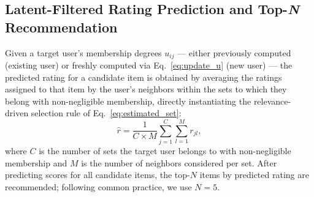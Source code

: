 \documentclass{article}
\theoremstyle{plain}
\theoremstyle{definition}
\theoremstyle{remark}
\begin{document}
\subsection{Latent-Filtered Rating Prediction and Top-\textit{N} Recommendation}
\label{subsec:rating_prediction}

Given a target user's membership degrees $u_{ij}$ — either previously computed (existing user) or freshly computed via Eq.~\eqref{eq:update_u} (new user) — the predicted rating for a candidate item is obtained by averaging the ratings assigned to that item by the user's neighbors within the sets to which they belong with non-negligible membership, directly instantiating the relevance-driven selection rule of Eq.~\eqref{eq:estimated_set}:
\begin{equation}
	\label{eq:avgrating}
	\hat{r} = \frac{1}{C \times M} \sum_{j=1}^{C} \sum_{l=1}^{M} r_{jl},
\end{equation}
where $C$ is the number of sets the target user belongs to with non-negligible membership and $M$ is the number of neighbors considered per set. After predicting scores for all candidate items, the top-$N$ items by predicted rating are recommended; following common practice, we use $N = 5$.
\end{document}
